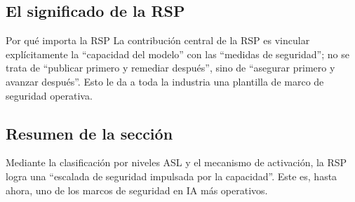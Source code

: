 \subsection{El significado de la RSP}

\begin{knowledgebox}{Por qué importa la RSP}
La contribución central de la RSP es vincular explícitamente la ``capacidad del modelo'' con las ``medidas de seguridad''; no se trata de ``publicar primero y remediar después'', sino de ``asegurar primero y avanzar después''. Esto le da a toda la industria una plantilla de marco de seguridad operativa.
\end{knowledgebox}

\subsection{Resumen de la sección}

Mediante la clasificación por niveles ASL y el mecanismo de activación, la RSP logra una ``escalada de seguridad impulsada por la capacidad''. Este es, hasta ahora, uno de los marcos de seguridad en IA más operativos.

